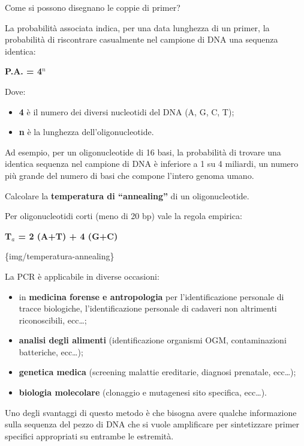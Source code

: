 \documentclass[11pt]{book}
\begin{document}
Come si possono disegnano le coppie di primer?

La probabilità associata indica, per una data lunghezza di un primer, la
probabilità di riscontrare casualmente nel campione di DNA una sequenza
identica:

\textbf{P.A. = 4\(^n\)}

Dove:

\begin{itemize}
\itemsep1pt\parskip0pt
\item
  \textbf{4} è il numero dei diversi nucleotidi del DNA (A, G, C, T);
\item
  \textbf{n} è la lunghezza dell'oligonucleotide.
\end{itemize}

Ad esempio, per un oligonucleotide di 16 basi, la probabilità di trovare
una identica sequenza nel campione di DNA è inferiore a 1 su 4 miliardi,
un numero più grande del numero di basi che compone l'intero genoma
umano.

Calcolare la \textbf{temperatura di ``annealing''} di un
oligonucleotide.

Per oligonucleotidi corti (meno di 20 bp) vale la regola empirica:

\textbf{T\(_a\) = 2 (A+T) + 4 (G+C)}

\{img/temperatura-annealing\}

La PCR è applicabile in diverse occasioni:

\begin{itemize}
\itemsep1pt\parskip0pt
\item
  in \textbf{medicina forense e antropologia} per l'identificazione
  personale di tracce biologiche, l'identificazione personale di
  cadaveri non altrimenti riconoscibili, ecc\ldots{};
\item
  \textbf{analisi degli alimenti} (identificazione organismi OGM,
  contaminazioni batteriche, ecc\ldots{});
\item
  \textbf{genetica medica} (screening malattie ereditarie, diagnosi
  prenatale, ecc\ldots{});
\item
  \textbf{biologia molecolare} (clonaggio e mutagenesi sito specifica,
  ecc\ldots{}).
\end{itemize}

Uno degli svantaggi di questo metodo è che bisogna avere qualche
informazione sulla sequenza del pezzo di DNA che si vuole amplificare
per sintetizzare primer specifici appropriati su entrambe le estremità.
\end{document}
